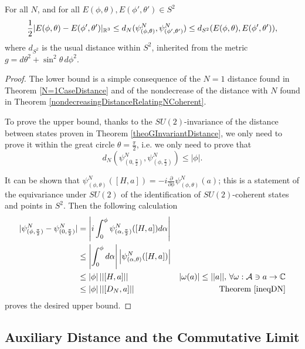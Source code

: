 \begin{theorem}\label{geometricDistanceCommutativeUpperBound}
For all $N$, and for all $E(\phi, \theta), E(\phi', \theta') \in S^2$
\begin{equation}
    \frac{1}{2}|E(\phi, \theta)- E(\phi', \theta')|_{\RR^3}  \leq d_N(\psi^N_{(\phi, \theta)}, \psi^N_{(\phi', \theta')}) \leq d_{S^2}(E(\phi, \theta), E(\phi', \theta')),
\end{equation}
where $d_{S^2}$ is the usual distance within $S^2$, inherited from the metric $g = d\theta^2 + \sin^2 \theta \, d\phi^2$.
\end{theorem}
\begin{proof}
The lower bound is a simple consequence of the $N = 1$ distance found in Theorem \ref{N=1CaseDistance} and of the nondecrease of the distance with $N$ found in Theorem \ref{nondecreasingDistanceRelatingNCoherent}.

To prove the upper bound, thanks to the $SU(2)$-invariance of the distance between states proven in Theorem \ref{theoGInvariantDistance}, we only need to prove it within the great circle $\theta = \frac{\pi}{2}$, i.e. we only need to prove that 
\begin{equation*}
    d_N(\psi^N_{(0, \frac{\pi}{2})}, \psi^N_{(\phi, \frac{\pi}{2})}) \leq |\phi|.
\end{equation*}

It can be shown that $\psi^N_{(\phi, \theta)}([H, a]) = -i \frac{\partial}{\partial \phi} \psi^N_{(\phi, \theta)}(a)$; this is a statement of the equivariance under $SU(2)$ of the identification of $SU(2)$-coherent states and points in $S^2$. Then the following calculation
\begin{align*}
    |\psi^N_{(\phi, \frac{\pi}{2})} - \psi^N_{(0, \frac{\pi}{2})}| 
        &= \left|i \int_0^\phi \psi^N_{(\alpha, \frac{\pi}{2})}([H, a]) d\alpha \right|  \\
        &\leq \left| \int_0^\phi d\alpha \right| \left| \psi^N_{(\alpha, \theta)}([H, a]) \right|\\
        &\leq |\phi|\,||[H, a]|| 
        & |\omega(a)| \leq ||a||,\,\forall\omega: \acal \ni a \to \CC\\
        &\leq |\phi|\, ||[D_N, a]||    & \text{Theorem \ref{ineqDN}}
\end{align*}
proves the desired upper bound.
\end{proof}
\subsection{Auxiliary Distance and the Commutative Limit}
\label{ChFSSectionLimit}

